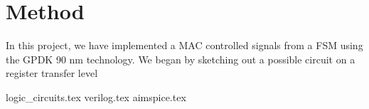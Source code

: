 \section{Method}
In this project, we have implemented a MAC controlled signals from a FSM using the GPDK 90 nm technology. We began by sketching out a possible circuit on a register transfer level


{logic_circuits.tex}
{verilog.tex}
{aimspice.tex}